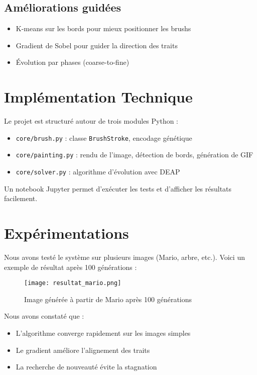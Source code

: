 \documentclass[11pt,a4paper]{article}
\begin{document}
\subsection{Améliorations guidées}
\begin{itemize}
    \item K-means sur les bords pour mieux positionner les brushs
    \item Gradient de Sobel pour guider la direction des traits
    \item Évolution par phases (coarse-to-fine)
\end{itemize}

\section{Implémentation Technique}
Le projet est structuré autour de trois modules Python :
\begin{itemize}
    \item \texttt{core/brush.py} : classe \texttt{BrushStroke}, encodage génétique
    \item \texttt{core/painting.py} : rendu de l'image, détection de bords, génération de GIF
    \item \texttt{core/solver.py} : algorithme d'évolution avec DEAP
\end{itemize}

Un notebook Jupyter permet d'exécuter les tests et d'afficher les résultats facilement.

\section{Expérimentations}
Nous avons testé le système sur plusieurs images (Mario, arbre, etc.). Voici un exemple de résultat après 100 générations :

\begin{figure}[H]
    \centering
    \texttt{[image: resultat\_mario.png]}
    \caption{Image générée à partir de Mario après 100 générations}
\end{figure}

Nous avons constaté que :
\begin{itemize}
    \item L'algorithme converge rapidement sur les images simples
    \item Le gradient améliore l'alignement des traits
    \item La recherche de nouveauté évite la stagnation
\end{itemize}
\end{document}
